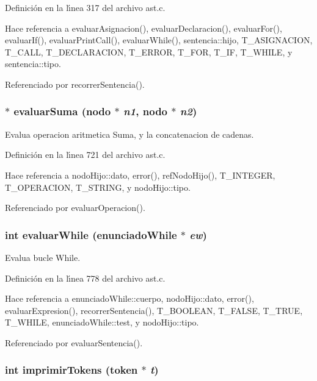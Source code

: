 Definici\'{o}n en la l\'{\i}nea 317 del archivo ast.c.

Hace referencia a evaluar\-Asignacion(), evaluar\-Declaracion(), evaluar\-For(), evaluar\-If(), evaluar\-Print\-Call(), evaluar\-While(), sentencia::hijo, T\_\-ASIGNACION, T\_\-CALL, T\_\-DECLARACION, T\_\-ERROR, T\_\-FOR, T\_\-IF, T\_\-WHILE, y sentencia::tipo.

Referenciado por recorrer\-Sentencia().
\subsubsection{$\ast$ evaluar\-Suma ({\bf nodo} $\ast$ {\em n1}, {\bf nodo} $\ast$ {\em n2})}\label{ast_8h_a50}


Evalua operacion aritmetica Suma, y la concatenacion de cadenas. 



Definici\'{o}n en la l\'{\i}nea 721 del archivo ast.c.

Hace referencia a nodo\-Hijo::dato, error(), ref\-Nodo\-Hijo(), T\_\-INTEGER, T\_\-OPERACION, T\_\-STRING, y nodo\-Hijo::tipo.

Referenciado por evaluar\-Operacion().
\subsubsection{\setlength{\rightskip}{0pt plus 5cm}int evaluar\-While ({\bf enunciado\-While} $\ast$ {\em ew})}\label{ast_8h_a55}


Evalua bucle While. 



Definici\'{o}n en la l\'{\i}nea 778 del archivo ast.c.

Hace referencia a enunciado\-While::cuerpo, nodo\-Hijo::dato, error(), evaluar\-Expresion(), recorrer\-Sentencia(), T\_\-BOOLEAN, T\_\-FALSE, T\_\-TRUE, T\_\-WHILE, enunciado\-While::test, y nodo\-Hijo::tipo.

Referenciado por evaluar\-Sentencia().
\subsubsection{\setlength{\rightskip}{0pt plus 5cm}int imprimir\-Tokens ({\bf token} $\ast$ {\em t})}\label{ast_8h_a58}


